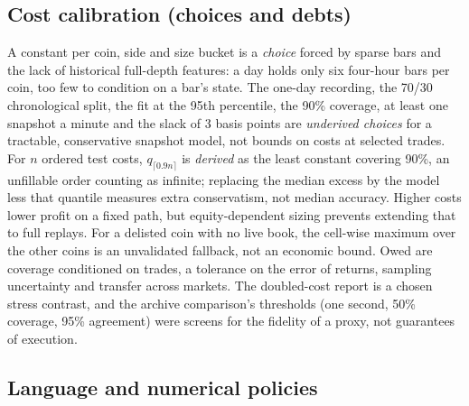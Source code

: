 \documentclass[11pt]{article}
\begin{document}
\subsection{Cost calibration (choices and debts)}\label{app:costs}

A constant per coin, side and size bucket is a \emph{choice} forced by sparse bars and the lack of historical full-depth features: a day holds only six four-hour bars per coin, too few to condition on a bar's state. The one-day recording, the 70/30 chronological split, the fit at the 95th percentile, the 90\% coverage, at least one snapshot a minute and the slack of 3 basis points are \emph{underived choices} for a tractable, conservative snapshot model, not bounds on costs at selected trades. For $n$ ordered test costs, $q_{\lceil0.9n\rceil}$ is \emph{derived} as the least constant covering 90\%, an unfillable order counting as infinite; replacing the median excess by the model less that quantile measures extra conservatism, not median accuracy. Higher costs lower profit on a fixed path, but equity-dependent sizing prevents extending that to full replays. For a delisted coin with no live book, the cell-wise maximum over the other coins is an unvalidated fallback, not an economic bound. Owed are coverage conditioned on trades, a tolerance on the error of returns, sampling uncertainty and transfer across markets. The doubled-cost report is a chosen stress contrast, and the archive comparison's thresholds (one second, 50\% coverage, 95\% agreement) were screens for the fidelity of a proxy, not guarantees of execution.

\subsection{Language and numerical policies}\label{app:kernel}
\end{document}
